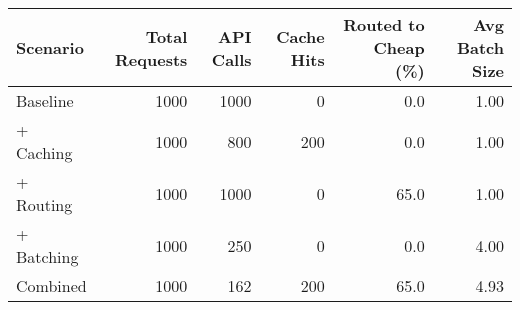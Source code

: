 \begin{tabular}{lrrrrr}
\toprule
Scenario & Total Requests & API Calls & Cache Hits & Routed to Cheap (\%) & Avg Batch Size \\
\midrule
Baseline & 1000 & 1000 & 0 & 0.0 & 1.00 \\
+ Caching & 1000 & 800 & 200 & 0.0 & 1.00 \\
+ Routing & 1000 & 1000 & 0 & 65.0 & 1.00 \\
+ Batching & 1000 & 250 & 0 & 0.0 & 4.00 \\
Combined & 1000 & 162 & 200 & 65.0 & 4.93 \\
\bottomrule
\end{tabular}